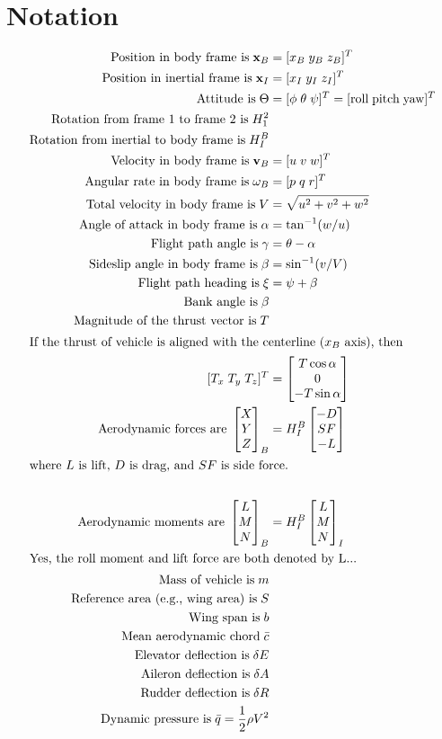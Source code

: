 \documentclass{article}
\newcommand\Vector[1]{\setstackEOL{,}\bracketVectorstack{#1}}
\def\vec#1{{\bf #1}}
\begin{document}
\section{Notation}

\begin{align}
  \textrm{Position in body frame is}\; \vec{x}_B &= [x_B\;y_B\;z_B]^T \\
  \textrm{Position in inertial frame is}\;\vec{x}_I &= [x_I\;y_I\;z_I]^T \\
  \textrm{Attitude is}\;\Theta &= [\phi\;\theta\;\psi]^T =
  [\textrm{roll}\;\textrm{pitch}\; \textrm{yaw}]^T\\
  \textrm{Rotation from frame 1 to frame 2 is}\; H_1^2 \\
  \textrm{Rotation from inertial to body frame is}\; H_I^B \\
  \textrm{Velocity in body frame is}\;\vec{v}_B &= [u\;v\;w]^T\\
  \textrm{Angular rate in body frame is}\; \vec{\omega}_B &= [p\;q\;r]^T\\
  \textrm{Total velocity in body frame is}\; V &= \sqrt{u^2 + v^2 + w^2}\\
  \textrm{Angle of attack in body frame is}\;\alpha &= \tan^{-1}(w/u)\\
  \textrm{Flight path angle is}\; \gamma &= \theta - \alpha \\
  \textrm{Sideslip angle in body frame is}\; \beta &= \sin^{-1}(v/V)\\
  \textrm{Flight path heading is}\; \xi &= \psi + \beta \\
  \textrm{Bank angle is} \; \beta \\
  \textrm{Magnitude of the thrust vector is}\;T\\
  \intertext{If the thrust of vehicle is aligned with the centerline ($x_B$
    axis), then} [T_x\; T_y\; T_z]^T &= \Vector{T \cos \alpha, 0, -T
    \sin \alpha}\\
  \textrm{Aerodynamic forces are}\; \Vector{X, Y, Z}_B &= H^B_I \Vector{-D,SF,-L}\\
  \intertext{where $L$ is lift, $D$ is drag, and $SF$ is side force.} \\
  \textrm{Aerodynamic moments are}\; \Vector{L, M, N}_B &= H^B_I
  \Vector{L,M,N}_I \\
  \intertext{Yes, the roll moment and lift force are both denoted by L...}
  \textrm{Mass of vehicle is}\;m\\
  \textrm{Reference area (e.g., wing area) is}\; S \\
  \textrm{Wing span is}\; b \\
  \textrm{Mean aerodynamic chord}\;\bar{c}\\
  \textrm{Elevator deflection is}\; \delta E\\
  \textrm{Aileron deflection is}\; \delta A\\
  \textrm{Rudder deflection is}\; \delta R\\
  \textrm{Dynamic pressure is}\; \bar{q} = \frac{1}{2}\rho V^2
\end{align}
\end{document}
